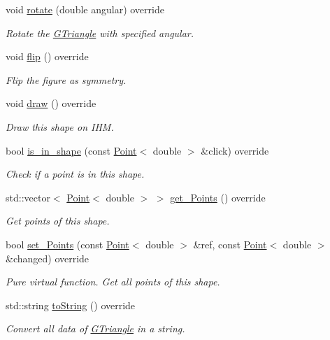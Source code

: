 \begin{DoxyCompactItemize}
void \hyperlink{classGTriangle_ae3ed75bbad4ba7fed68bc06c5834cfbe}{rotate} (double angular) override
\begin{DoxyCompactList}\small\item\em Rotate the \hyperlink{classGTriangle}{G\+Triangle} with specified angular. \end{DoxyCompactList}\item 
\mbox{\label{classGTriangle_ab223d049ce2518095201b99c8940e724}} 
void \hyperlink{classGTriangle_ab223d049ce2518095201b99c8940e724}{flip} () override
\begin{DoxyCompactList}\small\item\em Flip the figure as symmetry. \end{DoxyCompactList}\item 
\mbox{\label{classGTriangle_adb7a211b65860ce4dfcc13275cd5052d}} 
void \hyperlink{classGTriangle_adb7a211b65860ce4dfcc13275cd5052d}{draw} () override
\begin{DoxyCompactList}\small\item\em Draw this shape on I\+HM. \end{DoxyCompactList}\item 
bool \hyperlink{classGTriangle_abb6f7243155483cc6de301931e87475a}{is\+\_\+in\+\_\+shape} (const \hyperlink{classPoint}{Point}$<$ double $>$ \&click) override
\begin{DoxyCompactList}\small\item\em Check if a point is in this shape. \end{DoxyCompactList}\item 
std\+::vector$<$ \hyperlink{classPoint}{Point}$<$ double $>$ $>$ \hyperlink{classGTriangle_add4581d1b52836142de5817de4d52d17}{get\+\_\+\+Points} () override
\begin{DoxyCompactList}\small\item\em Get points of this shape. \end{DoxyCompactList}\item 
bool \hyperlink{classGTriangle_adb9dae329128600209c54cc4587480ee}{set\+\_\+\+Points} (const \hyperlink{classPoint}{Point}$<$ double $>$ \&ref, const \hyperlink{classPoint}{Point}$<$ double $>$ \&changed) override
\begin{DoxyCompactList}\small\item\em Pure virtual function. Get all points of this shape. \end{DoxyCompactList}\item 
std\+::string \hyperlink{classGTriangle_a8381aeea39fac0d52ad9e0d45b791b3b}{to\+String} () override
\begin{DoxyCompactList}\small\item\em Convert all data of \hyperlink{classGTriangle}{G\+Triangle} in a string. \end{DoxyCompactList}\end{DoxyCompactItemize}
